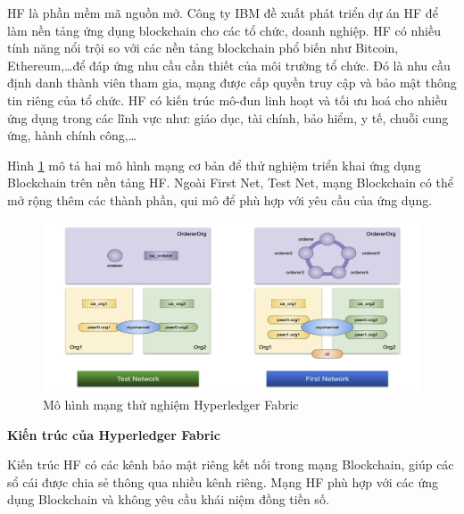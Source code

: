 HF là phần mềm mã nguồn mở.
Công ty IBM đề xuất phát triển dự án HF để làm nền tảng ứng dụng blockchain cho các tổ chức, doanh nghiệp. 
HF có nhiều tính năng nổi trội so với các nền tảng blockchain phổ biến như Bitcoin, Ethereum,\ldots để đáp ứng nhu cầu cần thiết của môi trường tổ chức.
Đó là nhu cầu định danh thành viên tham gia, mạng được cấp quyền truy cập và bảo mật thông tin riêng của tổ chức.
HF có kiến trúc mô-đun linh hoạt và tối ưu hoá cho nhiều ứng dụng trong các lĩnh vực như: giáo dục, tài chính, bảo hiểm, y tế, chuỗi cung ứng, hành chính công,\ldots{}

Hình \ref{fig:hlf_network} mô tả hai mô hình mạng cơ bản để thử nghiệm triển khai ứng dụng Blockchain trên nền tảng HF.
Ngoài First Net, Test Net, mạng Blockchain có thể mở rộng thêm các thành phần, qui mô để phù hợp với yêu cầu của ứng dụng. 

\begin{figure}[htbp]
\centering
\includegraphics[width=.9\linewidth]{img/hlf_network.png}
\caption{Mô hình mạng thử nghiệm Hyperledger Fabric}
\label{fig:hlf_network}
\end{figure}

\textbf{Kiến trúc của Hyperledger Fabric}

Kiến trúc HF có các kênh bảo mật riêng kết nối trong mạng Blockchain, giúp các   sổ cái được chia sẻ thông qua nhiều kênh riêng. Mạng HF phù hợp với các ứng   dụng Blockchain và không yêu cầu khái niệm đồng tiền số.

